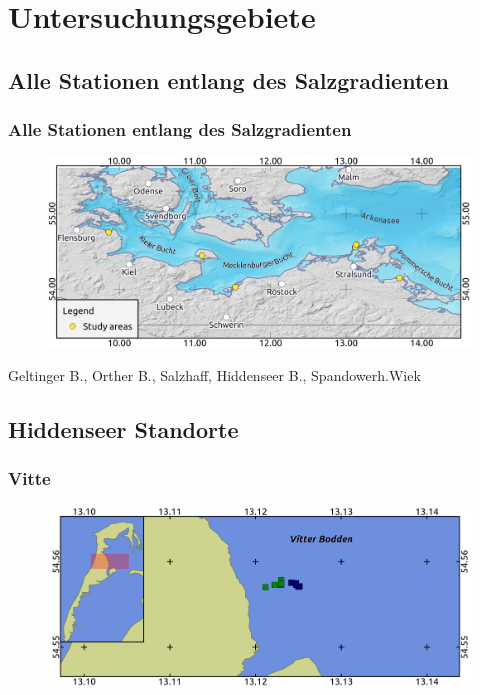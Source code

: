 \documentclass{beamer}
\begin{document}
\section{Untersuchungsgebiete}
\subsection{Alle Stationen entlang des Salzgradienten}
\begin{frame}
\frametitle{Alle Stationen entlang des Salzgradienten}
\begin{figure}
\includegraphics[scale=0.24]{images/Uebersicht.png}
\end{figure}
\begin{center}
Geltinger B., Orther B., Salzhaff, Hiddenseer B., Spandowerh.Wiek
\end{center}
\end{frame}

\subsection{Hiddenseer Standorte}

\begin{frame}
\frametitle{Vitte}
\begin{figure}
\includegraphics[scale=0.24]{images/Vitte.png}
\end{figure}
\end{frame}
\end{document}
